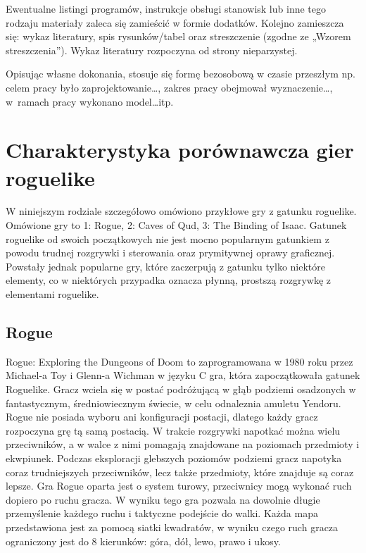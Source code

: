 \documentclass[12pt,twoside]{article}
\begin{document}
Ewentualne listingi programów, instrukcje obsługi stanowisk lub inne tego rodzaju materiały zaleca się zamieścić w formie dodatków. Kolejno zamieszcza się: wykaz literatury, spis rysunków/tabel oraz streszczenie (zgodne ze „Wzorem streszczenia”). Wykaz literatury rozpoczyna od strony nieparzystej.

Opisując własne dokonania, stosuje się formę bezosobową w czasie przeszłym np. celem pracy było zaprojektowanie\ldots, zakres pracy obejmował wyznaczenie\ldots, w~ramach pracy wykonano model\ldots itp.

\fi

\section{Charakterystyka porównawcza gier roguelike}

W niniejszym rodziale szczegółowo omówiono przykłowe gry z gatunku roguelike. Omówione gry to 1: Rogue, 2: Caves of Qud, 3: The Binding of Isaac. Gatunek roguelike od swoich początkowych nie jest mocno popularnym gatunkiem z powodu trudnej rozgrywki i sterowania oraz prymitywnej oprawy graficznej. Powstały jednak popularne gry, które zaczerpują z gatunku tylko niektóre elementy, co w niektórych przypadka oznacza płynną, prostszą rozgrywkę z elementami roguelike.

\subsection{Rogue}

Rogue: Exploring the Dungeons of Doom to zaprogramowana w 1980 roku przez Michael-a Toy i Glenn-a Wichman w języku C gra, która zapoczątkowała gatunek Roguelike. Gracz wciela się w postać podróżującą w głąb podziemi osadzonych w fantastycznym, średniowiecznym świecie, w celu odnaleznia amuletu Yendoru. Rogue nie posiada wyboru ani konfiguracji postacji, dlatego każdy gracz rozpoczyna grę tą samą postacią. W trakcie rozgrywki napotkać można wielu przeciwników, a w walce z nimi pomagają znajdowane na poziomach przedmioty i ekwpiunek. Podczas eksploracji glebszych poziomów podziemi gracz napotyka coraz trudniejszych przeciwników, lecz także przedmioty, które znajduje są coraz lepsze. Gra Rogue oparta jest o system turowy, przeciwnicy mogą wykonać ruch dopiero po ruchu gracza. W wyniku tego gra pozwala na dowolnie długie przemyślenie każdego ruchu i taktyczne podejście do walki. Każda mapa przedstawiona jest za pomocą siatki kwadratów, w wyniku czego ruch gracza ograniczony jest do 8 kierunków: góra, dół, lewo, prawo i ukosy. 
\end{document}
